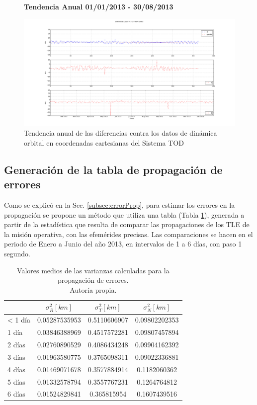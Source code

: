 \begin{figure}[!h]
\centering
  \textbf{Tendencia Anual 01/01/2013 - 30/08/2013}\par\medskip
  \includegraphics[width=\textwidth]{imagenes/SACD2013todEjesajustados}
  \caption{Tendencia anual de las diferencias contra los datos de din\'amica orbital en coordenadas cartesianas del Sistema TOD}
  \label{fig:sacd2013}
\end{figure}

\subsection*{Generaci\'on de la tabla de propagaci\'on de errores}

Como se explic\'o en la Sec. \ref{subsec:errorProp}, para estimar los errores en la propagaci\'on se propone un m\'etodo que utiliza una tabla (Tabla \ref{tab:resultatabla}), generada a partir de la estad\'istica que resulta de comparar las propagaciones de los TLE de la misi\'on operativa, con las efem\'erides precisas. Las comparaciones se hacen en el periodo de Enero a Junio del a\~no 2013, en intervalos de 1 a 6 d\'ias, con paso 1 segundo.\\

\begin{table}[!h]
\caption[Tabla con los valores medios para la propagaci\'on de errores.]{Valores medios de las varianzas calculadas para la propagaci\'on de errores.\\ Autor\'ia propia.}
\begin{tabular}{lccc}
\hline \hline
\rowcolor{yellow!35}
&$\sigma^{2}_R [km]$ &$\sigma^{2}_T [km]$ &$\sigma^{2}_N [km]$\\
\hline \hline
< 1 d\'ia & 0.05287535953&0.5110606907&0.09802202353\\
\hline
1 d\'ia & 0.03846388969&0.4517572281&0.09807457894\\
\hline
2 d\'ias & 0.02760890529&0.4086434248&0.09904162392\\
\hline
3 d\'ias & 0.01963580775&0.3765098311&0.09022336881\\
\hline
4 d\'ias & 0.01469071678&0.3577884914&0.1182060362\\
\hline
5 d\'ias & 0.01332578794&0.3557767231&0.1264764812\\
\hline
6 d\'ias & 0.01524829841&0.365815954&0.1607439516\\
\hline
\end{tabular}
\label{tab:resultatabla}
\end{table}

